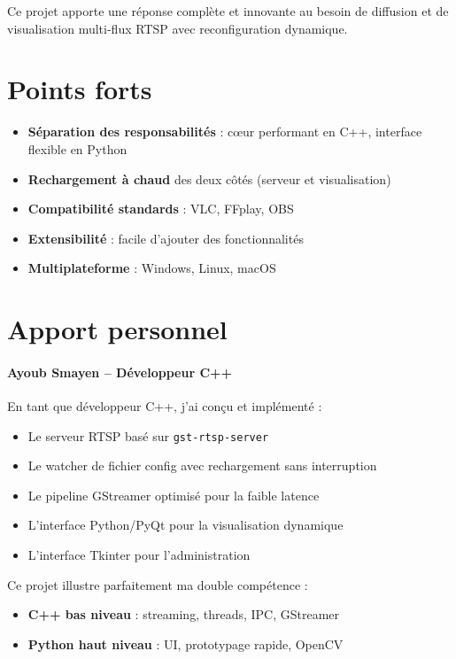\documentclass[12pt,a4paper]{report}
\begin{document}
Ce projet apporte une réponse complète et innovante au besoin de diffusion et de visualisation multi-flux RTSP avec reconfiguration dynamique.

\section{Points forts}

\begin{itemize}
    \item \textbf{Séparation des responsabilités} : cœur performant en C++, interface flexible en Python
    \item \textbf{Rechargement à chaud} des deux côtés (serveur et visualisation)
    \item \textbf{Compatibilité standards} : VLC, FFplay, OBS
    \item \textbf{Extensibilité} : facile d'ajouter des fonctionnalités
    \item \textbf{Multiplateforme} : Windows, Linux, macOS
\end{itemize}

\section{Apport personnel}

\paragraph{Ayoub Smayen – Développeur C++}

En tant que développeur C++, j'ai conçu et implémenté :
\begin{itemize}
    \item Le serveur RTSP basé sur \texttt{gst-rtsp-server}
    \item Le watcher de fichier config avec rechargement sans interruption
    \item Le pipeline GStreamer optimisé pour la faible latence
    \item L'interface Python/PyQt pour la visualisation dynamique
    \item L'interface Tkinter pour l'administration
\end{itemize}

Ce projet illustre parfaitement ma double compétence :
\begin{itemize}
    \item \textbf{C++ bas niveau} : streaming, threads, IPC, GStreamer
    \item \textbf{Python haut niveau} : UI, prototypage rapide, OpenCV
\end{itemize}
\end{document}
